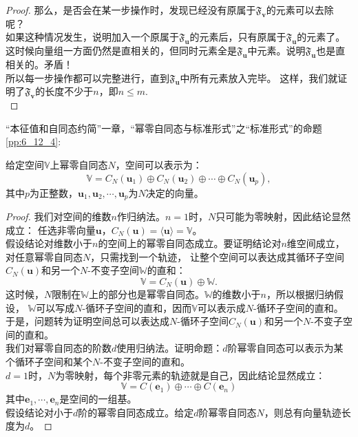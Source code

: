 \documentclass[12pt,UTF8]{ctexbook}
\begin{document}
\begin{appendix}
\begin{proof}
    那么，是否会在某一步操作时，发现已经没有原属于$\mathfrak{F}_{\mathbf{v}}$的元素可以去除呢？\\
    如果这种情况发生，说明加入一个原属于$\mathfrak{F}_{\mathbf{u}}$的元素后，只有原属于$\mathfrak{F}_{\mathbf{u}}$的元素了。
    这时候向量组一方面仍然是直相关的，但同时元素全是$\mathfrak{F}_{\mathbf{u}}$中元素。说明$\mathfrak{F}_{\mathbf{u}}$也是直相关的。矛盾！\\
    所以每一步操作都可以完整进行，直到$\mathfrak{F}_{\mathbf{u}}$中所有元素放入完毕。
    这样，我们就证明了$\mathfrak{F}_{\mathbf{v}}$的长度不少于$n$，即$n \leq m$.\\
\end{proof}

“本征值和自同态约简”一章，“幂零自同态与标准形式”之“标准形式”的命题\ref{pp:6_12_4}:
\begin{pp}\label{c-20}
    给定空间$\mathbb{V}$上幂零自同态$N$，空间可以表示为：
    $$ \mathbb{V} = C_N(\mathbf{u}_1) \oplus C_N(\mathbf{u}_2) \oplus \cdots \oplus C_N(\mathbf{u}_p),$$
    其中$p$为正整数，$\mathbf{u}_1, \mathbf{u}_2, \cdots , \mathbf{u}_p$为$N$决定的向量。
\end{pp}
\begin{proof} %
我们对空间的维数$n$作归纳法。$n=1$时，$N$只可能为零映射，因此结论显然成立：
任选非零向量$\mathbf{u}$，$C_N(\mathbf{u}) = \langle \mathbf{u} \rangle = \mathbb{V}$。\\
假设结论对维数小于$n$的空间上的幂零自同态成立。要证明结论对$n$维空间成立，对任意幂零自同态$N$，只需找到一个轨迹，
让整个空间可以表达成其循环子空间$C_N(\mathbf{u})$和另一个$N$-不变子空间$\mathbb{W}$的直和：
$$ \mathbb{V} = C_N(\mathbf{u}) \oplus \mathbb{W}.$$
这时候，$N$限制在$\mathbb{W}$上的部分也是幂零自同态。$\mathbb{W}$的维数小于$n$，所以根据归纳假设，
$\mathbb{W}$可以写成$N$-循环子空间的直和，因而$\mathbb{V}$可以表示成$N$-循环子空间的直和。\\
于是，问题转为证明空间总可以表达成$N$-循环子空间$C_N(\mathbf{u})$和另一个$N$-不变子空间的直和。\\
我们对幂零自同态的阶数$d$使用归纳法。证明命题：$d$阶幂零自同态可以表示为某个循环子空间和某个$N$-不变子空间的直和。\\
$d=1$时，$N$为零映射，每个非零元素的轨迹就是自己，因此结论显然成立：
$$\mathbb{V} = C(\mathbf{e}_1) \oplus \cdots \oplus C(\mathbf{e}_n)$$
其中$\mathbf{e}_1, \cdots , \mathbf{e}_n$是空间的一组基。\\
假设结论对小于$d$阶的幂零自同态成立。给定$d$阶幂零自同态$N$，则总有向量轨迹长度为$d$。

\end{proof}
\end{appendix}
\end{document}
